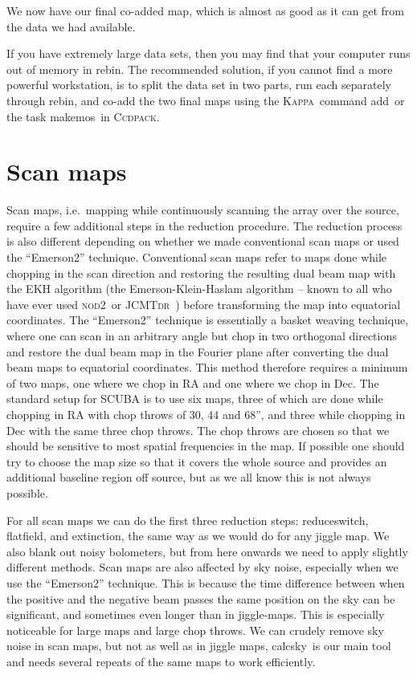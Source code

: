 \documentclass[twoside,11pt]{article}
\newcommand{\Kappa}{\xref{\textsc{Kappa}}{sun95}{}}
\newcommand{\ccdpack}{\xref{\textsc{Ccdpack}}{sun139}{}}
\newcommand{\jcmtdr}{\xref{\textsc{JCMTdr}}{sun132}{}}
\newcommand{\nod}{\textsc{nod2}}
\newcommand{\task}[1]{\textsf{#1}}
\newcommand{\rebin}{\xref{\task{rebin}}{sun216}{REBIN}}
\newcommand{\calcsky}{\xref{\task{calcsky}}{sun216}{CALCSKY}}
\newcommand{\resw}{\xref{\task{reduce\_switch}}{sun216}{REDUCE_SWITCH}}
\newcommand{\flatf}{\xref{\task{flatfield}}{sun216}{FLATFIELD}}
\newcommand{\ext}{\xref{\task{extinction}}{sun216}{EXTINCTION}}
\newcommand{\add}{\xref{\task{add}}{sun95}{ADD}}
\newcommand{\makemos}{\xref{\task{makemos}}{sun139}{MAKEMOS}}
\newcommand{\xref}[3]{#1}
\newcommand{\xlabel}[1]{}
\renewcommand{\_}{\texttt{\symbol{95}}}
\begin{document}
We now have our final co-added map, which is almost as good as it
can get from the data we had available.

If you have extremely large data sets, then you may find that your
computer runs out of memory in \rebin.  The recommended solution, if
you cannot find a more powerful workstation, is to split the data set
in two parts, run each separately through \rebin, and co-add the two
final maps using the \Kappa\ command \add\ or the task \makemos\ in
\ccdpack.


\section{\xlabel{Scanmaps}Scan maps}

Scan maps, i.e.\ mapping while continuously scanning the array over the
source, require a few additional steps in the reduction procedure. The
reduction process is also different depending on whether we made
conventional scan maps or used the ``Emerson2'' technique.
Conventional scan maps refer to maps done while chopping in the scan
direction and restoring the resulting dual beam map with the
EKH algorithm (the Emerson-Klein-Haslam algorithm -- known to all who
have ever used \nod\ or \jcmtdr\ \cite{jcmtdr}) before transforming the
map into equatorial coordinates.  The ``Emerson2'' technique is
essentially a basket weaving technique, where one can scan in an
arbitrary angle but chop in two orthogonal directions and restore the
dual beam map in the Fourier plane after converting the dual beam maps
to equatorial coordinates. This method therefore requires a minimum of
two maps, one where we chop in RA and one where we chop in Dec. The
standard setup for SCUBA is to use six maps, three of which are done
while chopping in RA with chop throws of 30, 44 and 68'', and three
while chopping in Dec with the same three chop throws. The chop throws
are chosen so that we should be sensitive to most spatial frequencies
in the map. If possible one should try to choose the map size so that
it covers the whole source and provides an additional baseline region
off source, but as we all know this is not always possible.

For all scan maps we can do the first three reduction steps: \resw,
\flatf, and \ext, the same way as we would do for any jiggle map.  We
also blank out noisy bolometers, but from here onwards we need to
apply slightly different methods.  Scan maps are also affected by sky
noise, especially when we use the ``Emerson2'' technique.  This is
because the time difference between when the positive and the negative
beam passes the same position on the sky can be significant, and
sometimes even longer than in jiggle-maps.  This is especially
noticeable for large maps and large chop throws.  We can crudely
remove sky noise in scan maps, but not as well as in jiggle maps,
\calcsky\ is our main tool and needs several repeats of the same maps
to work efficiently.
\end{document}
